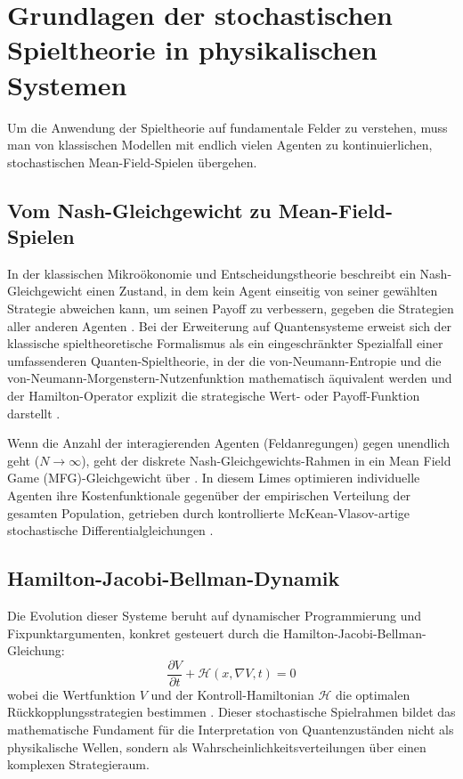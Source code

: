 \documentclass[12pt,a4paper]{article}
\theoremstyle{remark}
\begin{document}
\section{Grundlagen der stochastischen Spieltheorie in physikalischen Systemen}
\label{sec:foundations}

Um die Anwendung der Spieltheorie auf fundamentale Felder zu verstehen, muss man von klassischen Modellen mit endlich vielen Agenten zu kontinuierlichen, stochastischen Mean-Field-Spielen \"ubergehen.

\subsection{Vom Nash-Gleichgewicht zu Mean-Field-Spielen}

In der klassischen Mikro\"okonomie und Entscheidungstheorie beschreibt ein Nash-Gleichgewicht einen Zustand, in dem kein Agent einseitig von seiner gew\"ahlten Strategie abweichen kann, um seinen Payoff zu verbessern, gegeben die Strategien aller anderen Agenten \citep{QuantumStrategies2024}. Bei der Erweiterung auf Quantensysteme erweist sich der klassische spieltheoretische Formalismus als ein eingeschr\"ankter Spezialfall einer umfassenderen Quanten-Spieltheorie, in der die von-Neumann-Entropie und die von-Neumann-Morgenstern-Nutzenfunktion mathematisch \"aquivalent werden und der Hamilton-Operator explizit die strategische Wert- oder Payoff-Funktion darstellt \citep{QuantumFoundations2023}.

Wenn die Anzahl der interagierenden Agenten (Feldanregungen) gegen unendlich geht ($N \to \infty$), geht der diskrete Nash-Gleichgewichts-Rahmen in ein Mean Field Game (MFG)-Gleichgewicht \"uber \citep{MFG2025}. In diesem Limes optimieren individuelle Agenten ihre Kostenfunktionale gegen\"uber der empirischen Verteilung der gesamten Population, getrieben durch kontrollierte McKean-Vlasov-artige stochastische Differentialgleichungen \citep{QuantumGameDecision2024}.

\subsection{Hamilton-Jacobi-Bellman-Dynamik}

Die Evolution dieser Systeme beruht auf dynamischer Programmierung und Fixpunktargumenten, konkret gesteuert durch die Hamilton-Jacobi-Bellman-Gleichung:
\begin{equation}
\frac{\partial V}{\partial t} + \mathcal{H}\left(x, \nabla V, t\right) = 0
\end{equation}
wobei die Wertfunktion $V$ und der Kontroll-Hamiltonian $\mathcal{H}$ die optimalen R\"uckkopplungsstrategien bestimmen \citep{QuantumGameDecision2024}. Dieser stochastische Spielrahmen bildet das mathematische Fundament f\"ur die Interpretation von Quantenzust\"anden nicht als physikalische Wellen, sondern als Wahrscheinlichkeitsverteilungen \"uber einen komplexen Strategieraum.
\end{document}
